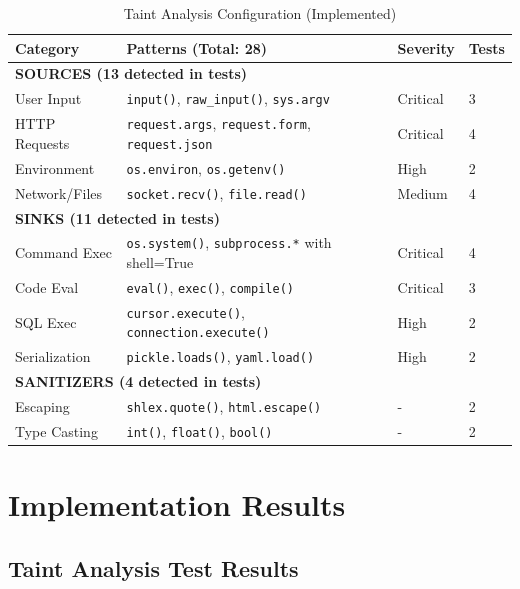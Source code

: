 \begin{table}[H]
\centering
\caption{Taint Analysis Configuration (Implemented)}
\label{tab:taint-config-impl}
\scriptsize
\begin{tabular}{|p{2.5cm}|p{5.5cm}|p{2cm}|p{2cm}|}
\hline
\textbf{Category} & \textbf{Patterns (Total: 28)} & \textbf{Severity} & \textbf{Tests} \\
\hline
\multicolumn{4}{|l|}{\textbf{SOURCES (13 detected in tests)}} \\
\hline
User Input & \texttt{input()}, \texttt{raw\_input()}, \texttt{sys.argv} & Critical & 3 \\
\hline
HTTP Requests & \texttt{request.args}, \texttt{request.form}, \texttt{request.json} & Critical & 4 \\
\hline
Environment & \texttt{os.environ}, \texttt{os.getenv()} & High & 2 \\
\hline
Network/Files & \texttt{socket.recv()}, \texttt{file.read()} & Medium & 4 \\
\hline
\multicolumn{4}{|l|}{\textbf{SINKS (11 detected in tests)}} \\
\hline
Command Exec & \texttt{os.system()}, \texttt{subprocess.*} with shell=True & Critical & 4 \\
\hline
Code Eval & \texttt{eval()}, \texttt{exec()}, \texttt{compile()} & Critical & 3 \\
\hline
SQL Exec & \texttt{cursor.execute()}, \texttt{connection.execute()} & High & 2 \\
\hline
Serialization & \texttt{pickle.loads()}, \texttt{yaml.load()} & High & 2 \\
\hline
\multicolumn{4}{|l|}{\textbf{SANITIZERS (4 detected in tests)}} \\
\hline
Escaping & \texttt{shlex.quote()}, \texttt{html.escape()} & - & 2 \\
\hline
Type Casting & \texttt{int()}, \texttt{float()}, \texttt{bool()} & - & 2 \\
\hline
\end{tabular}
\end{table}

\section{Implementation Results}

\subsection{Taint Analysis Test Results}

